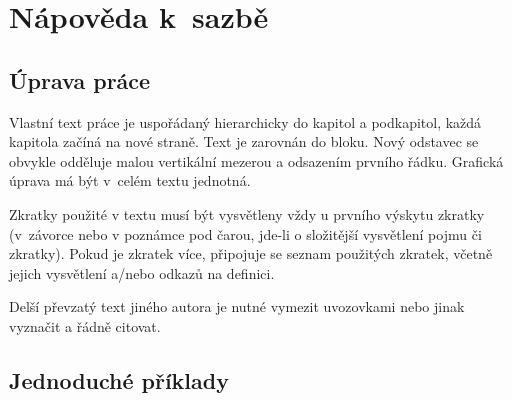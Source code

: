 
\chapter{Nápověda k~sazbě}

\section{Úprava práce}

Vlastní text práce je uspořádaný hierarchicky do kapitol a podkapitol,
každá kapitola začíná na nové straně. Text je zarovnán do bloku. Nový odstavec
se obvykle odděluje malou vertikální mezerou a odsazením prvního řádku. Grafická
úprava má být v~celém textu jednotná.

Zkratky použité v textu musí být vysvětleny vždy u prvního výskytu zkratky (v~závorce nebo
v poznámce pod čarou, jde-li o složitější vysvětlení pojmu či zkratky). Pokud je zkratek
více, připojuje se seznam použitých zkratek, včetně jejich vysvětlení a/nebo odkazů
na definici.

Delší převzatý text jiného autora je nutné vymezit uvozovkami nebo jinak vyznačit a řádně
citovat.




\section{Jednoduché příklady}

